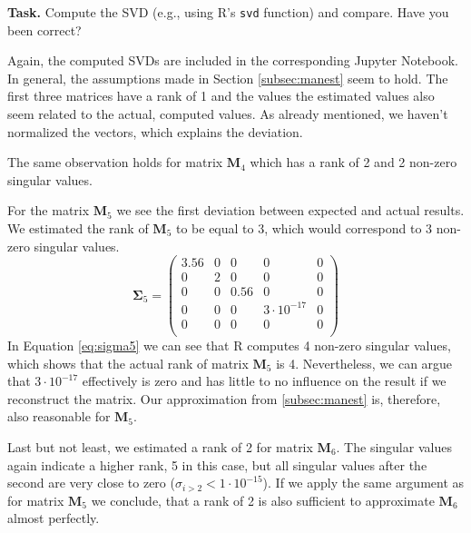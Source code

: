 \documentclass{support/acm_proc_article-sp}
\begin{document}
    \textbf{Task.} Compute the SVD (e.g., using R's \lstinline{svd} function) and compare.
    Have you been correct?

    Again, the computed SVDs are included in the corresponding Jupyter Notebook.
    In general, the assumptions made in Section \ref{subsec:manest} seem to hold.
    The first three matrices have a rank of 1 and the values the estimated values also seem related to the actual, computed
    values.
    As already mentioned, we haven't normalized the vectors, which explains the deviation.

    The same observation holds for matrix $\mathbf{M}_4$ which has a rank of 2 and 2 non-zero singular values.

    For the matrix $\mathbf{M}_5$ we see the first deviation between expected and actual results.
    We estimated the rank of $\mathbf{M}_5$ to be equal to 3, which would correspond to 3 non-zero singular values.
    \begin{equation}
        \mathbf{\Sigma}_5 = \begin{pmatrix}
            3.56 & 0 & 0    & 0              & 0 \\
            0    & 2 & 0    & 0              & 0 \\
            0    & 0 & 0.56 & 0              & 0 \\
            0    & 0 & 0    & 3\cdot10^{-17} & 0 \\
            0    & 0 & 0    & 0              & 0 \\
        \end{pmatrix}
        \label{eq:sigma5}
    \end{equation}
    In Equation \ref{eq:sigma5} we can see that R computes 4 non-zero singular values, which shows that the actual
    rank of matrix $\mathbf{M}_5$ is 4.
    Nevertheless, we can argue that $3\cdot10^{-17}$ effectively is zero and has little to no influence on the result
    if we reconstruct the matrix.
    Our approximation from \ref{subsec:manest} is, therefore, also reasonable for $\mathbf{M}_5$.

    Last but not least, we estimated a rank of 2 for matrix $\mathbf{M}_{6}$.
    The singular values again indicate a higher rank, 5 in this case, but all singular values after the second are
    very close to zero ($\sigma_{i > 2} < 1\cdot10^{-15}$).
    If we apply the same argument as for matrix $\mathbf{M}_5$ we conclude, that a rank of 2 is also sufficient to
    approximate $\mathbf{M}_{6}$ almost perfectly.
\end{document}
